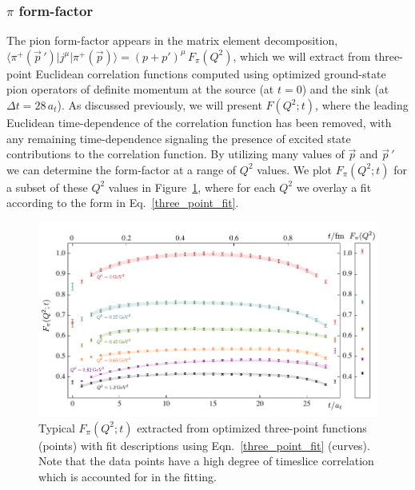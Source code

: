 \documentclass[twocolumn,amsmath,amssymb,prd,10pt,floatfix, 
superscriptaddress,nofootinbib, showpacs, preprintnumbers]{revtex4-1}
\begin{document}
\subsubsection{$\pi$ form-factor}


The pion form-factor appears in the matrix element decomposition, $\big\langle \pi^+(\vec{p}\,') \big| j^\mu \big| \pi^+(\vec{p}) \big\rangle = (p+p')^\mu \, F_\pi(Q^2)$, which we will extract from three-point Euclidean correlation functions computed using optimized ground-state pion operators of definite momentum at the source (at $t=0$) and the sink (at $\Delta t = 28\, a_t$). As discussed previously, we will present $F(Q^2;t)$, where the leading Euclidean time-dependence of the correlation function has been removed, with any remaining time-dependence signaling the presence of excited state contributions to the correlation function. By utilizing many values of $\vec{p}$ and  $\vec{p}\,'$ we can determine the form-factor at a range of $Q^2$ values. We plot $F_\pi(Q^2;t)$ for a subset of these $Q^2$ values in Figure~\ref{fig::pion_proj0_pion_proj0_Q2_dep}, where for each $Q^2$ we overlay a fit according to the form in Eq.~\ref{three_point_fit}.

\begin{figure}[h]
  \includegraphics[width=\linewidth]{fig12.pdf}
  \caption{ Typical $F_\pi(Q^2; t)$ extracted from optimized three-point functions (points) with fit descriptions using Eqn.~\ref{three_point_fit} (curves). Note that the data points have a high degree of timeslice correlation which is accounted for in the fitting.  \label{fig::pion_proj0_pion_proj0_Q2_dep}}
\end{figure}
\end{document}
